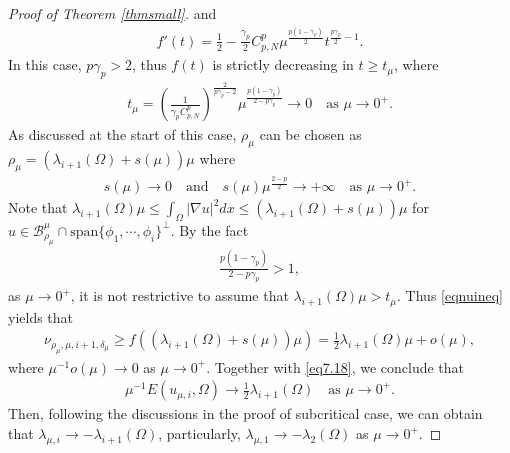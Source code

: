 \documentclass[10pt,a4paper]{article}
\theoremstyle{definition} \theoremstyle{remark}
\numberwithin{equation}{section}
\newcommand{\B}{\mathcal{B}}
\newcommand{\la}{\lambda}
\newcommand{\ga}{\gamma}
\begin{document}
\begin{proof}[Proof of Theorem \ref{thmsmall}]
and
\begin{align*}
	f'(t) = \frac12 - \frac{\ga_p}2 C_{p,N}^p \mu^{\frac{p(1-\ga_p)}{2}}t ^{\frac{p\ga_p}{2}-1}.
\end{align*}
In this case, $p\ga_p > 2$, thus $f(t)$ is strictly decreasing in $t \ge t_\mu$,
where
\begin{align*}
	t_\mu = \left( \frac{1}{\ga_pC_{p,N}^p}\right) ^{\frac{2}{p\ga_p-2}}\mu^{\frac{p(1-\ga_p)}{2-p\ga_p}} \to 0 \quad \text{as } \mu \to 0^+.
\end{align*}
As discussed at the start of this case, $\rho_\mu$ can be chosen as $\rho_\mu = (\la_{i+1}(\Omega)+s(\mu))\mu$ where
\begin{align*}
	s(\mu) \to 0 \quad \text{and} \quad s(\mu)\mu^{\frac{2-p}{2}} \to +\infty \quad \text{as } \mu \to 0^+.
\end{align*}
Note that $\la_{i+1}(\Omega)\mu \le \int_\Omega |\nabla u|^2dx \le (\la_{i+1}(\Omega)+s(\mu))\mu$ for $u \in \B_{\rho_\mu}^\mu \cap \text{span}\{\phi_1,\cdots,\phi_{i}\}^{\bot}$. By the fact
\begin{align*}
	\frac{p(1-\ga_p)}{2-p\ga_p} > 1,
\end{align*}
as $\mu \to 0^+$, it is not restrictive to assume that $\la_{i+1}(\Omega)\mu > t_\mu$. Thus \eqref{eqnuineq} yields that
\begin{align*}
	\nu_{\rho_\mu,\mu,i+1,\delta_\mu} \geq f((\la_{i+1}(\Omega)+s(\mu))\mu) = \frac12\la_{i+1}(\Omega)\mu + o(\mu),
\end{align*}
where $\mu^{-1}o(\mu) \to 0$ as $\mu \to 0^+$. Together with \eqref{eq7.18}, we conclude that
\begin{align*}
	\mu^{-1}E(u_{\mu,i},\Omega) \to \frac12\la_{i+1}(\Omega) \quad \text{as } \mu \to 0^+.
\end{align*}
Then, following the discussions in the proof of subcritical case, we can obtain that $\la_{\mu,i} \to -\la_{i+1}(\Omega)$, particularly, $\la_{\mu,1} \to -\la_2(\Omega)$ as $\mu \to 0^+$.


\end{proof}
\end{document}
